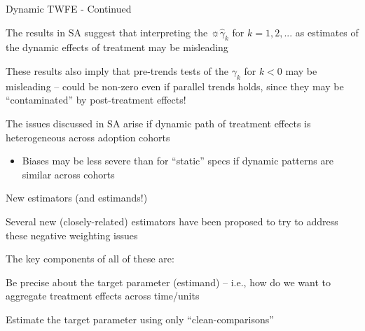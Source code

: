 \documentclass[aspectratio = 169, 13pt]{beamer}
\begin{document}
\begin{frame}{Dynamic TWFE - Continued}

  \begin{wideitemize}

    \item
    The results in SA suggest that interpreting the $\sun{\hat\gamma_k}$ for $k=1,2,...$ as estimates of the dynamic effects of treatment may be misleading


    \item
    These results also imply that pre-trends tests of the $\gamma_k$ for $k<0$ may be misleading -- could be non-zero even if parallel trends holds, since they may be ``contaminated'' by post-treatment effects!
    \pause

    \item
    The issues discussed in SA arise if dynamic path of treatment effects is heterogeneous across adoption cohorts
    \begin{itemize}
      \item
            Biases may be less severe than for ``static'' specs if dynamic patterns are similar across cohorts
    \end{itemize}


  \end{wideitemize}

\end{frame}

\begin{frame}{New estimators (and estimands!)}
  \begin{wideitemize}
    \item
    Several new (closely-related) estimators have been proposed to try to address these negative weighting issues

    \item
    The key components of all of these are:

    \begin{enumerate}
      {\normalsize
      \item
            Be precise about the target parameter (estimand) -- i.e., how do we want to aggregate treatment effects across time/units
            \bigskip

      \item
            Estimate the target parameter using only ``clean-comparisons''
            }
    \end{enumerate}
  \end{wideitemize}
\end{frame}
\end{document}
